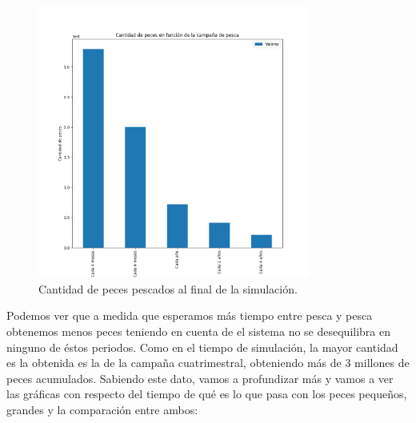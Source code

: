 \documentclass[11pt,a4paper]{report}
\begin{document}
\begin{figure}[H]
	\begin{center}
		\includegraphics[width=0.8\textwidth]{img/Cap-3/apartado-3/pescados_por_periodo.png}
		\caption{Cantidad de peces pescados al final de la simulación.}
		\label{fig:f3}
	\end{center}
\end{figure}

Podemos ver que a medida que esperamos más tiempo entre pesca y pesca obtenemos menos peces teniendo en cuenta de el sistema no se desequilibra en ninguno de éstos periodos. Como en el tiempo de simulación, la mayor cantidad es la obtenida es la de la campaña cuatrimestral, obteniendo más de 3 millones de peces acumulados. Sabiendo este dato, vamos a profundizar más y vamos a ver las gráficas con respecto del tiempo de qué es lo que pasa con los peces pequeños, grandes y la comparación entre ambos:
\end{document}
